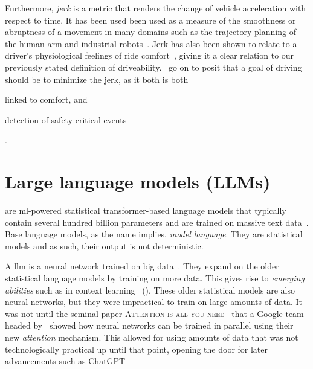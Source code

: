 Furthermore, \emph{jerk} is a metric that renders the change of vehicle acceleration with respect to
time. It has been used been used as a measure of the smoothness or abruptness of a movement in many
domains such as the trajectory planning of the human arm and industrial
robots~\cite[126]{fengJerk17}. Jerk has also been shown to relate to a driver’s
physiological feelings of ride comfort~\cite[126]{fengJerk17}, giving it a clear relation to our
previously stated definition of driveability.~\citeauthor{fengJerk17} go on to posit that a goal of
driving should be to minimize the jerk, as it both is both \begin{inparaenum}
    \item linked to comfort, and
    \item detection of safety-critical events
\end{inparaenum}\cite[126]{fengJerk17}.


\section{Large language models (LLMs)}

 are \acrfull{ml}-powered statistical transformer-based language
models that typically contain several hundred billion parameters and are trained
on massive text data~\cite[4]{llmSurvey}. Base language models, as the name
implies, \textit{model language}. They are statistical models and as such, their
output is not deterministic.

A \acrlong{llm} is a neural network trained on big data~\cite[3]{llmSurvey}. They expand on the
older statistical language models by training on more data. This gives rise to \textit{emerging
    abilities} such as in context learning~\cite[3]{llmSurvey} (). These
older statistical models are also neural networks, but they were impractical to train on large
amounts of data. It was not until the seminal paper \textsc{Attention is all you
    need}~\cite{attentionIsAllYouNeed} that a Google team headed by~\citeauthor{attentionIsAllYouNeed}
showed how neural networks can be trained in parallel using their new \textit{attention} mechanism.
This allowed for using amounts of data that was not technologically practical up until that point,
opening the door for later advancements such as
ChatGPT~\cite[9]{llmSurvey}



